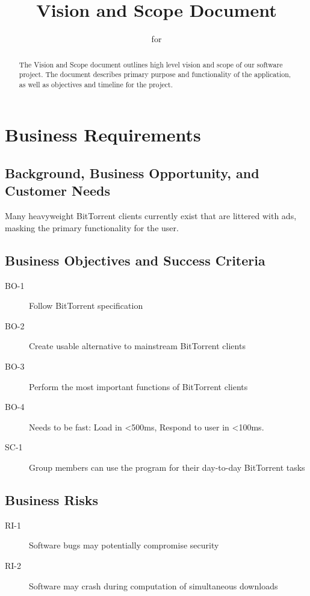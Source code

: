 \documentclass[letter]{scrartcl}
\newcommand{\app}{\sc{393torrent}}
\begin{document}
\title{Vision and Scope Document}
\subtitle{for \app}
\date{} %

\maketitle

\begin{abstract}
The Vision and Scope document outlines high level vision and scope of our software project.  The document describes primary purpose and functionality of the application, as well as objectives and timeline for the project. 
\end{abstract}

\tableofcontents
\pagebreak

\section{Business Requirements}
\subsection{Background, Business Opportunity, and Customer Needs}
Many heavyweight BitTorrent clients currently exist that are littered with ads, masking the primary functionality for the user.

\subsection{Business Objectives and Success Criteria}
\begin{description}
\item[BO-1] Follow BitTorrent specification
\item[BO-2] Create usable alternative to mainstream BitTorrent clients
\item[BO-3] Perform the most important functions of BitTorrent clients
\item[BO-4] Needs to be fast:
Load in \textless500ms,
Respond to user in \textless100ms.
\item[SC-1] Group members can use the program for their day-to-day BitTorrent tasks
\end{description}

\subsection{Business Risks}
\begin{description}
\item[RI-1] Software bugs may potentially compromise security
\item[RI-2] Software may crash during computation of simultaneous downloads
\end{description}
\end{document}
